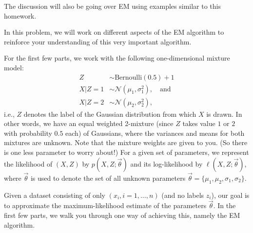 \documentclass[preview]{standalone}
\begin{document}
The discussion will also be going over EM using examples similar to
this homework. 

In this problem, we will work on different aspects of the EM algorithm to reinforce your understanding of this 
very important algorithm.

For the first few parts, we work with the following one-dimensional mixture model:
\begin{align*}
  Z &\sim \text{Bernoulli}(0.5) + 1\\
  X\vert Z=1 &\sim \mathcal{N}(\mu_1, \sigma_1^2), \quad \text{and}\\
  X\vert Z=2 &\sim \mathcal{N}(\mu_2, \sigma_2^2),
\end{align*}
i.e., $Z$ denotes the label of the Gaussian distribution from which $X$ is drawn.
In other words, we have an equal weighted 2-mixture (since $Z$ takes value
$1$ or $2$ with probability $0.5$ each) of Gaussians, where the variances and means for
both mixtures are unknown.
Note that the mixture weights are given to you. (So there is one less parameter to worry about!)
For a given set of parameters, we represent the likelihood of $(X, Z)$ by $p(X, Z; \vec{\theta})$ 
and its log-likelihood  by $\ell(X, Z; \vec{\theta})$,
where $\vec{\theta}$ is used to denote the set of all unknown parameters 
$\vec{\theta} = \{\mu_1, \mu_2, \sigma_1, \sigma_2\}$.

Given a dataset consisting of only $(x_i, i=1, \ldots, n)$ (and no
labels $z_i$), 
our goal is to approximate the maximum-likelihood estimate of the parameters $\vec\theta$.
In the first few parts, we walk you through one way of achieving this, namely the EM algorithm.
\end{document}
